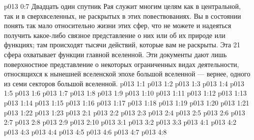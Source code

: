 \vs p013 0:7 Двадцать один спутник Рая служит многим целям как в центральной, так и в сверхвселенных, не раскрытых в этих повествованиях. Вы в состоянии понять так мало относительно жизни этих сфер, что не можете и надеяться получить какое\hyp{}либо связное представление о них или об их природе или функциях; там происходят тысячи действий, которые вам не раскрыты. Эта 21 сфера охватывает  функции главной вселенной. Эти документы дают лишь поверхностное представление о некоторых ограниченных видах деятельности, относящихся к нынешней вселенской эпохе большой вселенной --- вернее, одного из семи секторов большой вселенной.
\vs p013 1:1 
\vs p013 1:2 
\vs p013 1:3 
\vs p013 1:4 
\vs p013 1:5 \pc 
\vs p013 1:6 
\vs p013 1:7 
\vs p013 1:8 \pc 
\vs p013 1:9 
\vs p013 1:10 \pc 
\vs p013 1:11 
\vs p013 1:12 \pc 
\vs p013 1:13 
\vs p013 1:14 
\vs p013 1:15 
\vs p013 1:16 
\vs p013 1:17 
\vs p013 1:18 \pc 
\vs p013 1:19 
\vs p013 1:20 \pc 
\vs p013 1:21 
\vs p013 1:22 \pc 
\vs p013 1:23 
\vs p013 2:1 
\vs p013 2:2 
\vs p013 2:3 \pc 
\vs p013 2:4 \pc 
\vs p013 2:5 \pc 
\vs p013 2:6 \pc 
\vs p013 2:7 
\vs p013 2:8 
\vs p013 2:9 \pc 
\vs p013 2:10 
\vs p013 3:1 
\vs p013 3:2 
\vs p013 3:3 \pc 
{}
\vs p013 4:1 
\vs p013 4:2 
\vs p013 4:3 
\vs p013 4:4 \pc 
\vs p013 4:5 
\vs p013 4:6 \pc 
\vs p013 4:7 
\vsetoff
\vs p013 4:8 
\quizlink
